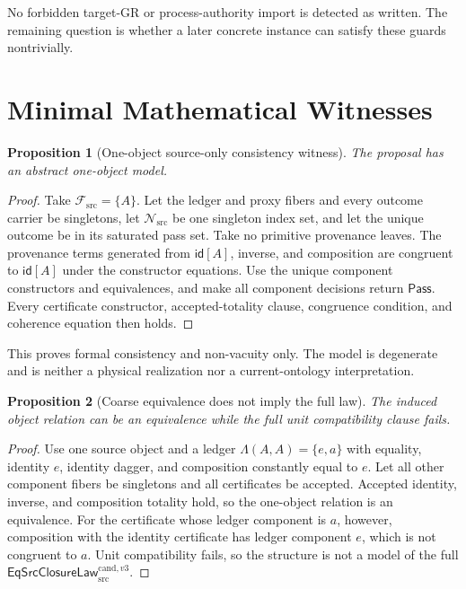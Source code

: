 \documentclass[11pt]{article}
\newtheorem{proposition}{Proposition}
\newcommand{\Law}{\mathsf{EqSrcClosureLaw}^{\mathrm{cand},v3}_{\mathrm{src}}}
\newcommand{\Pass}{\mathsf{Pass}}
\begin{document}
No forbidden target-GR or process-authority import is detected as written.
The remaining question is whether a later concrete instance can satisfy these
guards nontrivially.

\section{Minimal Mathematical Witnesses}

\begin{proposition}[One-object source-only consistency witness]
The proposal has an abstract one-object model.
\end{proposition}

\begin{proof}
Take \(\mathcal F_{\mathrm{src}}=\{A\}\). Let the ledger and proxy fibers and
every outcome carrier be singletons, let
\(\mathcal N_{\mathrm{src}}\) be one singleton index set, and let the unique
outcome be in its saturated pass set. Take no primitive provenance leaves.
The provenance terms generated from \(\mathsf{id}[A]\), inverse, and
composition are congruent to \(\mathsf{id}[A]\) under the constructor
equations. Use the unique component constructors and equivalences, and make
all component decisions return \(\Pass\). Every certificate constructor,
accepted-totality clause, congruence condition, and coherence equation then
holds.
\end{proof}

This proves formal consistency and non-vacuity only. The model is degenerate
and is neither a physical realization nor a current-ontology interpretation.

\begin{proposition}[Coarse equivalence does not imply the full law]
The induced object relation can be an equivalence while the full unit
compatibility clause fails.
\end{proposition}

\begin{proof}
Use one source object and a ledger
\(\Lambda(A,A)=\{e,a\}\) with equality, identity \(e\), identity dagger, and
composition constantly equal to \(e\). Let all other component fibers be
singletons and all certificates be accepted. Accepted identity, inverse, and
composition totality hold, so the one-object relation is an equivalence.
For the certificate whose ledger component is \(a\), however, composition
with the identity certificate has ledger component \(e\), which is not
congruent to \(a\). Unit compatibility fails, so the structure is not a model
of the full \(\Law\).
\end{proof}
\end{document}
